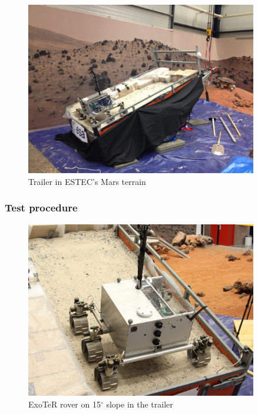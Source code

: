 \documentclass[a4paper,twocolumn]{esapub2005} %
\begin{document}



\begin{figure}[h!]
    \centering
    \includegraphics[width=0.9\textwidth]{trailersetup.jpg}
    \caption{Trailer in ESTEC's Mars terrain}
    \label{fig:trailer}
\end{figure}


\subsubsection{Test procedure}



\begin{figure}[h!]
    \centering
    \includegraphics[width=0.9\textwidth]{Exoslope.jpg}
    \caption{ExoTeR rover on 15$^{\circ}$ slope in the trailer}
    \label{fig:Exoslope}
\end{figure}
\end{document}

